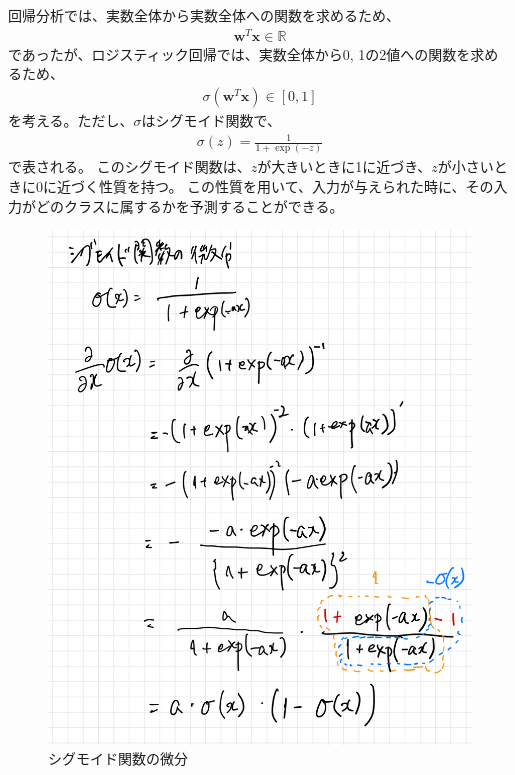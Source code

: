 \documentclass{ltjsarticle}
\begin{document}
回帰分析では、実数全体から実数全体への関数を求めるため、
\begin{align}
  \boldsymbol{w}^T\boldsymbol{x} \in \mathbb{R}
\end{align}
であったが、ロジスティック回帰では、実数全体から0, 1の2値への関数を求めるため、
\begin{align}
  \sigma(\boldsymbol{w}^T\boldsymbol{x}) \in [0, 1]
\end{align}
を考える。ただし、$\sigma$はシグモイド関数で、
\begin{align}
  \sigma(z) = \frac{1}{1+\exp(-z)}
\end{align}
で表される。
このシグモイド関数は、$z$が大きいときに1に近づき、$z$が小さいときに0に近づく性質を持つ。
この性質を用いて、入力が与えられた時に、その入力がどのクラスに属するかを予測することができる。
\begin{figure}[htbp]
  \centering
  \includegraphics[width=13cm]{capture/シグモイド関数の微分.png}
  \caption{シグモイド関数の微分}
\end{figure}

\newpage
\end{document}
